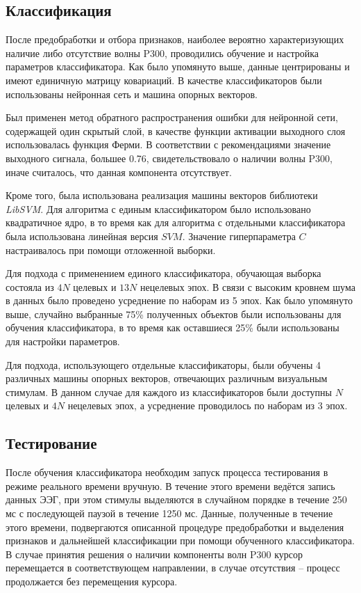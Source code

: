 \documentclass[12pt,fleqn]{article}
\begin{document}
\subsection{Классификация}
	\par После предобработки и отбора признаков, наиболее вероятно характеризующих наличие либо отсутствие волны P300, проводились обучение и  настройка параметров классификатора. Как было упомянуто выше, данные центрированы и имеют единичную матрицу ковариаций. В качестве классификаторов были использованы нейронная сеть и машина опорных векторов.
	\par Был применен метод обратного распространения ошибки для нейронной сети, содержащей один скрытый слой, в качестве функции активации выходного слоя использовалась функция Ферми. В соответствии с рекомендациями значение выходного сигнала, большее 0.76, свидетельствовало о наличии волны P300, иначе считалось, что данная компонента отсутствует.
	\par Кроме того, была использована реализация машины векторов библиотеки {\it LibSVM}. Для алгоритма с единым классификатором было использовано квадратичное ядро, в то время как для алгоритма с отдельными классификатора была использована линейная версия $SVM$. Значение гиперпараметра $C$ настраивалось при помощи отложенной выборки.
	\par Для подхода с применением единого классификатора, обучающая выборка состояла из $4N$ целевых и $13N$ нецелевых эпох. В связи с высоким кровнем шума в данных было проведено усреднение по наборам из 5 эпох. Как было упомянуто выше, случайно выбранные 75\% полученных объектов были использованы для обучения классификатора, в то время как оставшиеся 25\% были использованы для настройки параметров.
	\par Для подхода, использующего отдельные классификаторы, были обучены 4 различных машины опорных векторов, отвечающих различным визуальным стимулам. В данном случае для каждого из классификаторов были доступны $N$ целевых и $4N$ нецелевых эпох, а усреднение проводилось по наборам из 3 эпох.

\subsection{Тестирование}
	\par После обучения классификатора необходим запуск процесса тестирования в режиме реального времени вручную. В течение этого времени ведётся запись данных ЭЭГ, при этом стимулы выделяются в случайном порядке в течение 250 мс с последующей паузой в течение 1250 мс. Данные, полученные в течение этого времени, подвергаются описанной процедуре предобработки и выделения признаков и дальнейшей классификации при помощи обученного классификатора. В случае принятия решения о наличии компоненты волн P300 курсор перемещается в соответствующем направлении, в случае отсутствия -- процесс продолжается без перемещения курсора.
\end{document}
